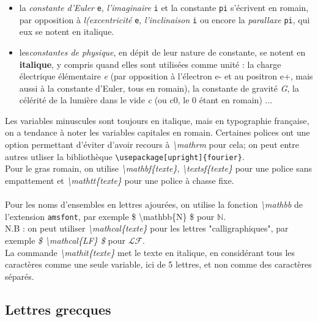 \documentclass[a4paper, 10pt]{book}
\begin{document}
\begin{itemize}
\item la \textit{constante d'Euler} \texttt{e}, \textit{l'imaginaire} \texttt{i} et la constante \texttt{pi} s'écrivent en romain, par opposition à \textit{l(excentricité} \texttt{e}, \textit{l'inclinaison} \texttt{i} ou encore la \textit{parallaxe} \texttt{pi}, qui eux se notent en italique.
\item les\textit{constantes de physique}, en dépit de leur nature de constante, se notent en \textbf{italique}, y compris quand elles sont utilisées comme unité : la charge électrique élémentaire \textit{e} (par opposition à l'électron e\uppercase{-} et au positron e\uppercase{+}, mais aussi à la constante d'Euler, tous en romain), la constante de gravité \textit{G}, la célérité de la lumière dans le vide \textit{c} (ou c\lowercase{0}, le 0 étant en romain) ... \\
\end{itemize}

Les variables minuscules sont toujours en italique, mais en typographie française, on a tendance à noter les variables capitales en romain. Certaines polices ont une option permettant d'éviter d'avoir recours à \textit{\textbackslash mathrm} pour cela; on peut entre autres utliser la bibliothèque \texttt{\textbackslash usepackage[upright]\{fourier\}}.\\
Pour le gras romain, on utilise \textit{\textbackslash mathbf\{texte\}}, \textit{\textbackslash textsf\{texte\}} pour une police sans empattement et \textit{\textbackslash mathtt\{texte\}} pour une police à chasse fixe. \\ \\
Pour les noms d'ensembles en lettres ajourées, on utilise la fonction \textit{\textbackslash mathbb} de l'extension \texttt{amsfont}, par exemple \$ \textbackslash mathbb\{N\} \$ pour $\mathbb{N}$. \\ 

\textsc{N.B} : on peut utiliser \textit{\textbackslash mathcal\{texte\}} pour les lettres "calligraphiques", par exemple \textit{\$ \textbackslash mathcal\{LF\} \$} pour $\mathcal{LF}$.\\
La commande \textit{\textbackslash mathit\{texte\}} met le texte en italique, en considérant tous les caractères comme une seule variable, ici de 5 lettres, et non comme des caractères séparés.

\subsection{Lettres grecques}
\end{document}
